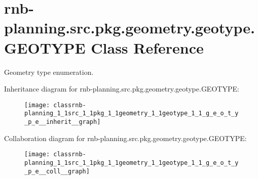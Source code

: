 \hypertarget{classrnb-planning_1_1src_1_1pkg_1_1geometry_1_1geotype_1_1_g_e_o_t_y_p_e}{}\section{rnb-\/planning.src.\+pkg.\+geometry.\+geotype.\+G\+E\+O\+T\+Y\+PE Class Reference}
\label{classrnb-planning_1_1src_1_1pkg_1_1geometry_1_1geotype_1_1_g_e_o_t_y_p_e}


Geometry type enumeration.  




Inheritance diagram for rnb-\/planning.src.\+pkg.\+geometry.\+geotype.\+G\+E\+O\+T\+Y\+PE\+:
\nopagebreak
\begin{figure}[H]
\begin{center}
\leavevmode
\texttt{[image: classrnb-planning\_1\_1src\_1\_1pkg\_1\_1geometry\_1\_1geotype\_1\_1\_g\_e\_o\_t\_y\_p\_e\_\_inherit\_\_graph]}
\end{center}
\end{figure}


Collaboration diagram for rnb-\/planning.src.\+pkg.\+geometry.\+geotype.\+G\+E\+O\+T\+Y\+PE\+:
\nopagebreak
\begin{figure}[H]
\begin{center}
\leavevmode
\texttt{[image: classrnb-planning\_1\_1src\_1\_1pkg\_1\_1geometry\_1\_1geotype\_1\_1\_g\_e\_o\_t\_y\_p\_e\_\_coll\_\_graph]}
\end{center}
\end{figure}
